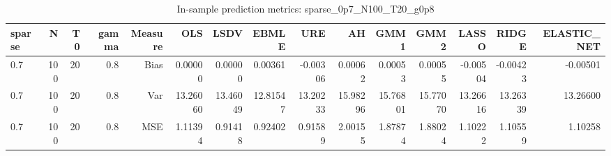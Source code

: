 \begin{table}[!htbp]\centering
\caption{In-sample prediction metrics: sparse_0p7_N100_T20_g0p8}
\label{tab:table2_sparse_0p7_N100_T20_g0p8}
\begin{tabular}{lrrrrrrrrrrrrrr}
\hline
sparse & N & T0 & gamma & Measure & OLS & LSDV & EBMLE & URE & AH & GMM1 & GMM2 & LASSO & RIDGE & ELASTIC_NET \\
\hline
0.7 & 100 & 20 & 0.8 & Bias & 0.00000 & 0.00000 & 0.00361 & -0.00306 & 0.00062 & 0.00053 & 0.00055 & -0.00504 & -0.00423 & -0.00501 \\
0.7 & 100 & 20 & 0.8 & Var & 13.26060 & 13.46049 & 12.81547 & 13.20233 & 15.98296 & 15.76801 & 15.77070 & 13.26616 & 13.26339 & 13.26600 \\
0.7 & 100 & 20 & 0.8 & MSE & 1.11394 & 0.91418 & 0.92402 & 0.91589 & 2.00155 & 1.87874 & 1.88024 & 1.10222 & 1.10559 & 1.10258 \\
\hline
\end{tabular}
\end{table}

